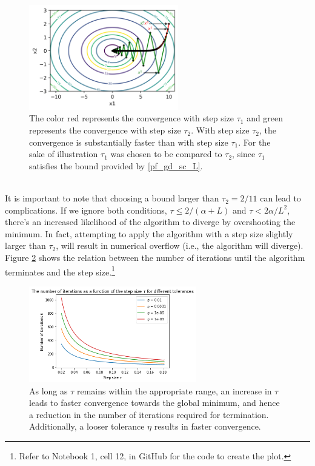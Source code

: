 \begin{figure}[h!]
    \centering
        \includegraphics[width=0.58\textwidth]{Pictures/Level sets of ellipsoid_fixed.png}
    \caption{The color red represents the convergence with step size $\tau_{1}$ and green represents the convergence with step size $\tau_{2}.$ With step size $\tau_{2}$, the convergence is substantially faster than with step size $\tau_{1}.$ For the sake of illustration $\tau_{1}$ was chosen to be compared to $\tau_{2}$, since $\tau_{1}$ satisfies the bound provided by \ref{pf_gd_sc_L}.}\label{fig:levelsets1_fixed}
\end{figure}\\
It is important to note that choosing a bound larger than $\tau_{2} = 2/11$ can lead to complications. If we ignore both conditions, $\tau \leq 2/(\alpha + L)$ and $\tau < 2\alpha / L^{2}$, there's an increased likelihood of the algorithm to diverge by overshooting the minimum. In fact, attempting to apply the algorithm with a step size slightly larger than $\tau_{2}$, will result in numerical overflow (i.e., the algorithm will diverge). Figure \ref{fig:GD_ell_fixed_iter} shows the relation between the number of iterations until the algorithm terminates and the step size.\footnote{Refer to Notebook 1, cell 12, in GitHub \cite{ThesisCode2023} for the code to create the plot.} 
\begin{figure}[h!]
    \centering
        \includegraphics[width=0.65\textwidth]{Pictures/GD ellipsoid_fixed_iterations_vs_stepsize.png}
    \caption{As long as $\tau$ remains within the appropriate range, an increase in $\tau$ leads to faster convergence towards the global minimum, and hence a reduction in the number of iterations required for termination. Additionally, a looser tolerance $\eta$ results in faster convergence.}\label{fig:GD_ell_fixed_iter}
\end{figure}
